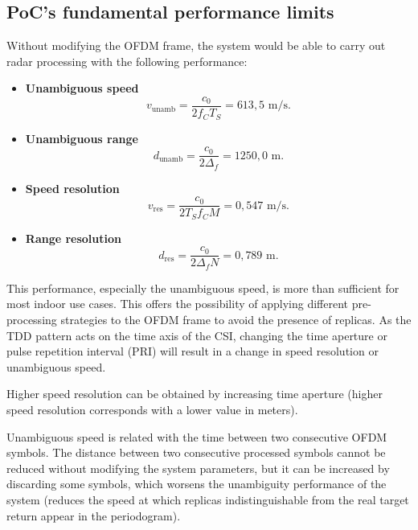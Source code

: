 	\subsection{PoC's fundamental performance limits}

		Without modifying the OFDM frame, the system would be able to carry out radar processing with the following performance:
		
		\begin{itemize}
			\item \textbf{Unambiguous speed}
			\vspace{-\baselineskip} %
			\begin{equation}
				v_{\text{unamb}} = \frac{c_0}{2f_C T_S} = 613,5\text{ m/s}.
			\end{equation}
			
			\item \textbf{Unambiguous range}
			\begin{equation}
				d_{\text{unamb}} = \frac{c_0}{2\Delta_f} = 1250,0\text{ m}.
			\end{equation}
			\item \textbf{Speed resolution}
			\begin{equation}
				v_{\text{res}} = \frac{c_0}{2T_Sf_CM} = 0,547 \text{ m/s}.
			\end{equation} 
			\item \textbf{Range resolution}
			\begin{equation}
				d_{\text{res}} = \frac{c_0}{2\Delta_fN} = 0,789 \text{ m}.
			\end{equation}  
		\end{itemize}
			
			This performance, especially the unambiguous speed, is more than sufficient for most indoor use cases. 
			This offers the possibility of applying different pre-processing strategies to the OFDM frame to avoid the presence of replicas. 
			As the TDD pattern acts on the time axis of the CSI, changing the time aperture or pulse repetition interval (PRI) will result in a change in speed resolution or unambiguous speed.
			
			Higher speed resolution can be obtained by increasing time aperture (higher speed resolution corresponds with a lower value in meters).
			
			Unambiguous speed is related with the time between two consecutive OFDM symbols. The distance between two consecutive processed symbols cannot be reduced without modifying the system parameters, but it can be increased by discarding some symbols, which worsens the unambiguity performance of the system (reduces the speed at which replicas indistinguishable from the real target return appear in the periodogram).
			
